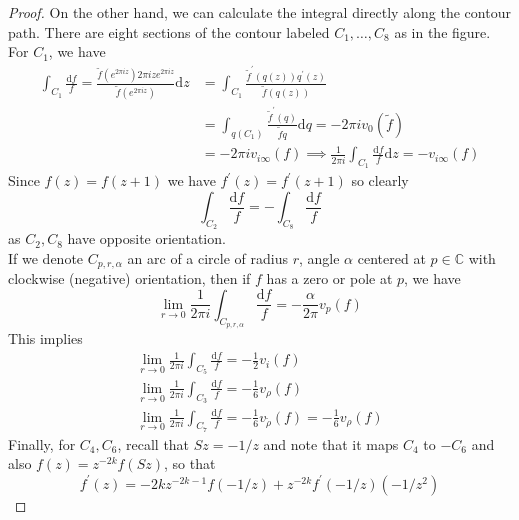 \documentclass[12pt]{article}
\theoremstyle{definition}
\begin{document}
\begin{proof}
On the other hand, we can calculate the integral directly along the contour path. There are eight sections of the contour labeled \(C_1,\dots,C_8\) as in the figure.\\[6pt]
For \(C_1\), we have
\begin{align*}
\int_{C_1} \frac{\mathrm{d} f}{f} = \frac{\widetilde{f}(e^{2\pi  iz}) 2 \pi  i z e^{2\pi  iz} }{\widetilde{f}(e^{2\pi iz}) }\mathrm{d} z &= \int_{C_1} \frac{\widetilde{f} ^{\prime} (q(z)) q^{\prime} (z)}{\widetilde{f}(q(z))}\\ &= \int_{q(C_1)} \frac{\widetilde{f}^{\prime} (q) }{\widetilde{f}q }\mathrm{d}q = -2\pi iv_0(\widetilde{f} )\\&=-2\pi iv_{i\infty }(f) \implies \frac{1}{2\pi i}\int_{C_1}\frac{\mathrm{d} f}{f}\mathrm{d}z  =-v_{i\infty }(f)
\end{align*}  
Since \(f(z)=f(z+1)\) we have \(f^{\prime} (z)=f^{\prime} (z+1)\) so clearly
\[
    \int_{C_2}\frac{\mathrm{d} f}{f} = - \int_{C_8} \frac{\mathrm{d} f}{f}
\] 
as \(C_2,C_8\)  have opposite orientation.~\\
If we denote \(C_{p,r,\alpha }\) an arc of a circle of radius \(r\), angle \(\alpha \) centered at \(p\in \mathbb{C} \) with clockwise (negative) orientation, then if \(f\) has a zero or pole at \(p\), we have
\[
    \lim_{r\to 0}\frac{1}{2\pi i}\int_{C_{p,r,\alpha }}\frac{\mathrm{d}f }{f}= -\frac{\alpha }{2\pi } v_p(f) 
\] 
This implies
\begin{align*}
    \lim_{r\to 0}\frac{1}{2\pi i}\int_{C_5}\frac{\mathrm{d}f }{f} = -\frac{1}{2}v_i(f)\\
    \lim_{r\to 0}\frac{1}{2\pi i}\int_{C_3}\frac{\mathrm{d}f }{f} = -\frac{1}{6}v_{\rho } (f)\\
    \lim_{r\to 0}\frac{1}{2\pi i}\int_{C_7}\frac{\mathrm{d}f }{f} = -\frac{1}{6}v_{\widetilde{\rho } }(f) = -\frac{1}{6}v_{\rho }(f)
\end{align*}
Finally, for \(C_4,C_6\), recall that \(Sz=-1/z\) and note that it maps \(C_4\) to \(-C_6\) and also \(f(z) = z^{-2k}f(Sz)\), so that
\[
    f^{\prime} (z)=-2k z^{-2k-1}f(-1/z)+z^{-2k}f^{\prime} (-1/z)(-1/z^2)
\]     


\end{proof}
\end{document}

